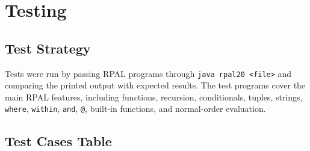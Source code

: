 \documentclass[12pt,a4paper]{article}
\begin{document}
\section{Testing}

\subsection{Test Strategy}

Tests were run by passing RPAL programs through \texttt{java rpal20 <file>} and comparing the printed output with expected results. The test programs cover the main RPAL features, including functions, recursion, conditionals, tuples, strings, \texttt{where}, \texttt{within}, \texttt{and}, \texttt{@}, built-in functions, and normal-order evaluation.

\subsection{Test Cases Table}
\end{document}

